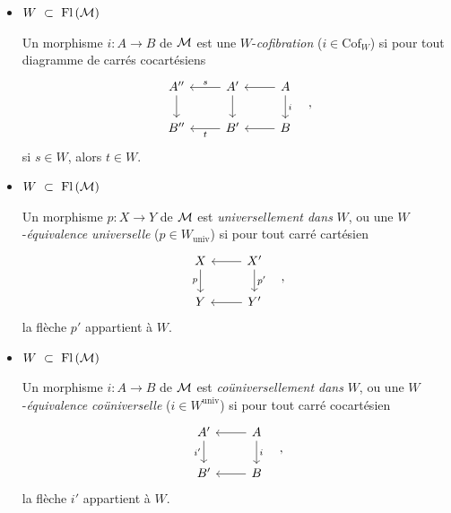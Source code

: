 \begin{itemize}
\item[\textbullet] $W \ \subset\ \mathrm{Fl}\,(\mathcal{M})$

Un morphisme $i : A \longrightarrow B$ de $\mathcal{M}$ est une $W$-\textit{cofibration} ($i \in \mathrm{Cof}_W$) si pour tout diagramme de carrés cocartésiens
\[
\begin{tikzcd}
A'' \arrow[d] & A' \arrow[l, "s"'] \arrow[d] & A \arrow[l] \arrow[d, "i"] \\
B'' & B' \arrow[l, "t"] & B \arrow[l]
\end{tikzcd}
\quad ,
\]
si $s \in W$, alors $t \in W$.

\item[\textbullet] $W \ \subset\ \mathrm{Fl}\,(\mathcal{M})$

Un morphisme $p : X \longrightarrow Y$ de $\mathcal{M}$ est \textit{universellement dans} $W$, ou une $W$-\textit{équivalence universelle} ($p \in W_{\mathrm{univ}}$) si pour tout carré cartésien
\[
\begin{tikzcd}
X \arrow[d, "p"'] & X' \arrow[l] \arrow[d, "p'"] \\
Y & Y' \arrow[l]
\end{tikzcd}
\quad ,
\]
la flèche $p'$ appartient à $W$.

\item[\textbullet] $W \ \subset\ \mathrm{Fl}\,(\mathcal{M})$

Un morphisme $i : A \longrightarrow B$ de $\mathcal{M}$ est \textit{coüniversellement dans} $W$, ou une $W$-\textit{équivalence coüniverselle} ($i \in W^{\mathrm{univ}}$) si pour tout carré cocartésien
\[
\begin{tikzcd}
A' \arrow[d, "i'"'] & A \arrow[l] \arrow[d, "i"] \\
B' & B \arrow[l]
\end{tikzcd}
\quad ,
\]
la flèche $i'$ appartient à $W$.
\end{itemize}


